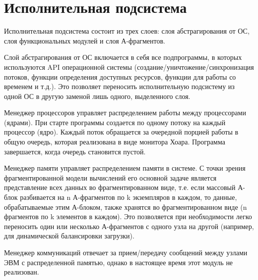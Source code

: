 \documentclass[11pt]{article}
\begin{document}
\section{Исполнительная подсистема}
Исполнительная подсистема состоит из трех слоев: слоя абстрагирования от ОС, слоя функциональных модулей и слоя А-фрагментов.\par
Слой абстрагирования от ОС включается в себя все подпрограммы, в которых используются API операционной системы (создание/уничтожение/синхронизация потоков, функции определения доступных ресурсов, функции для работы со временем и т.д.). Это позволяет переносить исполнительную подсистему из одной ОС в другую заменой лишь одного, выделенного слоя.\par
Менеджер процессоров управляет распределением работы между процессорами (ядрами). При старте программы создается по одному потоку на каждый процессор (ядро). Каждый поток обращается за очередной порцией работы в общую очередь, которая реализована в виде монитора Хоара. Программа завершается, когда очередь становится пустой.\par
Менеджер памяти управляет распределением памяти в системе. С точки зрения фрагментированной модели вычислений его основной задаче является представление всех данных во фрагментированном виде, т.е. если массовый А-блок разбивается на n А-фрагментов по k экземпляров в каждом, то данные, обрабатываемые этим А-блоком, также хранятся во фрагментированном виде (n фрагментов по k элементов в каждом). Это позволяется при необходимости легко переносить один или несколько А-фрагментов с одного узла на другой (например, для динамической балансировки загрузки).\par
Менеджер коммуникаций отвечает за прием/передачу сообщений между узлами ЭВМ с распределенной памятью, однако в настоящее время этот модуль не реализован.
\newpage
\pagestyle{fancy}
\fancyhf{}
\lfoot{\thepage}
\cfoot{\today}
\rfoot{\currfilename}
\end{document}
